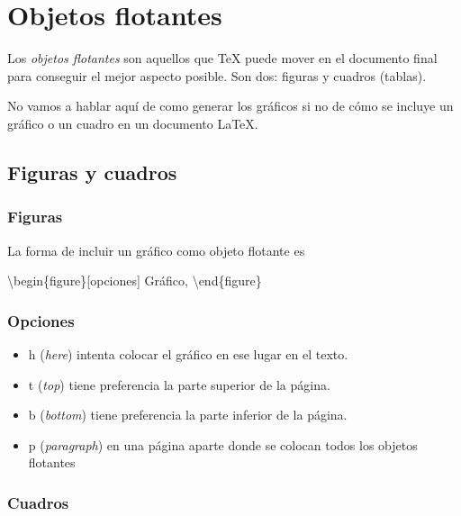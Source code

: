 \documentclass[11pt]{article}
\newenvironment{Shaded}{}{}
\newcommand{\NormalTok}[1]{{#1}}
\begin{document}
\section{Objetos flotantes}\label{objetos-flotantes}

Los \emph{objetos flotantes} son aquellos que TeX puede mover en el
documento final para conseguir el mejor aspecto posible. Son dos:
figuras y cuadros (tablas).

No vamos a hablar aquí de como generar los gráficos si no de cómo se
incluye un gráfico o un cuadro en un documento LaTeX.

\subsection{Figuras y cuadros}\label{figuras-y-cuadros}

\subsubsection{Figuras}\label{figuras}

La forma de incluir un gráfico como objeto flotante es

\begin{Shaded}
\begin{Highlighting}[]
\NormalTok{\textbackslash{}begin\{figure\}[opciones]}
\NormalTok{Gráfico,}
\NormalTok{\textbackslash{}end\{figure\}}
\end{Highlighting}
\end{Shaded}

\subsubsection{Opciones}\label{opciones}

\begin{itemize}
\itemsep1pt\parskip0pt
\item
  h (\emph{here}) intenta colocar el gráfico en ese lugar en el texto.
\item
  t (\emph{top}) tiene preferencia la parte superior de la página.
\item
  b (\emph{bottom}) tiene preferencia la parte inferior de la página.
\item
  p (\emph{paragraph}) en una página aparte donde se colocan todos los objetos flotantes
\end{itemize}

\subsubsection{Cuadros}\label{cuadros}
\end{document}
